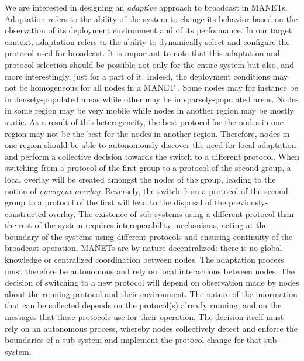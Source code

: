 We are interested in designing an \emph{adaptive} approach to broadcast in MANETs.
Adaptation refers to the ability of the system to change its behavior based on the observation of its deployment environment and of its performance.
In our target context, adaptation refers to the ability to dynamically select and configure the protocol used for broadcast.
It is important to note that this adaptation and protocol selection should be possible not only for the entire system but also, and more interestingly, just for a part of it.
Indeed, the deployment conditions may not be homogeneous for all nodes in a MANET .
Some nodes may for instance be in densely-populated areas while other may be in sparsely-populated areas.
Nodes in some region may be very mobile while nodes in another region may be mostly static.
As a result of this heterogeneity, the best protocol for the nodes in one region may not be the best for the nodes in another region.
Therefore, nodes in one region should be able to autonomously discover the need for local adaptation and perform a collective decision towards the switch to a different protocol.
When switching from a protocol of the first group to a protocol of the second group, a local overlay will be created amongst the nodes of the group, leading to the notion of \emph{emergent overlay}.
Reversely, the switch from a protocol of the second group to a protocol of the first will lead to the disposal of the previously-constructed overlay.
%
The existence of sub-systems using a different protocol than the rest of the system requires interoperability mechanisms, acting at the boundary of the systems using different protocols and ensuring continuity of the broadcast operation.
%
MANETs are by nature decentralized: there is no global knowledge or centralized coordination between nodes.
The adaptation process must therefore be autonomous and rely on local interactions between nodes.
The decision of switching to a new protocol will depend on observation made by nodes about the running protocol and their environment.
The nature of the information that can be collected depends on the protocol(s) already running, and on the messages that these protocols use for their operation.
The decision itself must rely on an autonomous process, whereby nodes collectively detect and enforce the boundaries of a sub-system and implement the protocol change for that sub-system.

